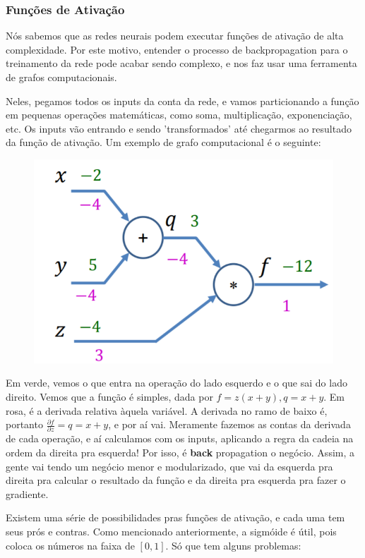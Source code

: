 \documentclass{article}
\begin{document}
\subsubsection{Funções de Ativação}
Nós sabemos que as redes neurais podem executar funções de ativação de alta complexidade. Por este motivo, entender o processo de backpropagation para o treinamento da rede pode acabar sendo complexo, e nos faz usar uma ferramenta de grafos computacionais.\par
Neles, pegamos todos os inputs da conta da rede, e vamos particionando a função em pequenas operações matemáticas, como soma, multiplicação, exponenciação, etc. Os inputs vão entrando e sendo 'transformados' até chegarmos ao resultado da função de ativação.
\newpage
Um exemplo de grafo computacional é o seguinte:
\begin{figure}[h]
\includegraphics[scale = 0.4]{grafo.PNG}
\end{figure}
Em verde, vemos o que entra na operação do lado esquerdo e o que sai do lado direito. Vemos que a função é simples, dada por $f = z(x+y), q = x + y$. Em rosa, é a derivada relativa àquela variável. A derivada no ramo de baixo é, portanto $\frac{\partial f}{\partial z} = q = x + y$, e por aí vai. Meramente fazemos as contas da derivada de cada operação, e aí calculamos com os inputs, aplicando a regra da cadeia na ordem da direita pra esquerda! Por isso, é \textbf{back} propagation o negócio. Assim, a gente vai tendo um negócio menor e modularizado, que vai da esquerda pra direita pra calcular o resultado da função e da direita pra esquerda pra fazer o gradiente.\par
Existem uma série de possibilidades pras funções de ativação, e cada uma tem seus prós e contras. Como mencionado anteriormente, a sigmóide é útil, pois coloca os números na faixa de $[0,1]$. Só que tem alguns problemas:
\end{document}
